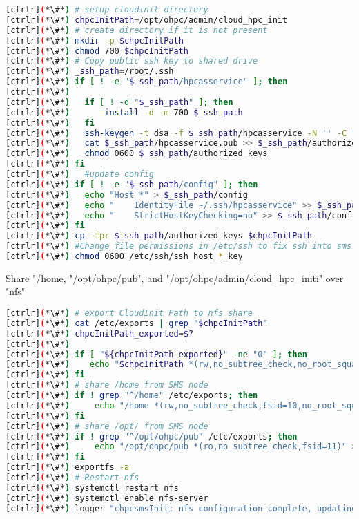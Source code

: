 \begin{lstlisting}[language=bash,keywords={}]
[ctrlr](*\#*) # setup cloudinit directory
[ctrlr](*\#*) chpcInitPath=/opt/ohpc/admin/cloud_hpc_init
[ctrlr](*\#*) # create directory if it is not present
[ctrlr](*\#*) mkdir -p $chpcInitPath
[ctrlr](*\#*) chmod 700 $chpcInitPath
[ctrlr](*\#*) # Copy public ssh key to shared drive
[ctrlr](*\#*) _ssh_path=/root/.ssh
[ctrlr](*\#*) if [ ! -e "$_ssh_path/hpcasservice" ]; then
[ctrlr](*\#*) 
[ctrlr](*\#*) 	if [ ! -d "$_ssh_path" ]; then
[ctrlr](*\#*) 		install -d -m 700 $_ssh_path
[ctrlr](*\#*) 	fi
[ctrlr](*\#*) 	ssh-keygen -t dsa -f $_ssh_path/hpcasservice -N '' -C "HPC Cluster key" > /dev/null 2>&1
[ctrlr](*\#*) 	cat $_ssh_path/hpcasservice.pub >> $_ssh_path/authorized_keys
[ctrlr](*\#*) 	chmod 0600 $_ssh_path/authorized_keys
[ctrlr](*\#*) fi
[ctrlr](*\#*) 	#update config
[ctrlr](*\#*) if [ ! -e "$_ssh_path/config" ]; then
[ctrlr](*\#*) 	echo "Host *" > $_ssh_path/config
[ctrlr](*\#*) 	echo "    IdentityFile ~/.ssh/hpcasservice" >> $_ssh_path/config
[ctrlr](*\#*) 	echo "    StrictHostKeyChecking=no" >> $_ssh_path/config
[ctrlr](*\#*) fi
[ctrlr](*\#*) cp -fpr $_ssh_path/authorized_keys $chpcInitPath
[ctrlr](*\#*) #Change file permissions in /etc/ssh to fix ssh into sms nodes
[ctrlr](*\#*) chmod 0600 /etc/ssh/ssh_host_*_key

\end{lstlisting} 

	Share "/home, "/opt/ohpc/pub", and "/opt/ohpc/admin/cloud\_hpc\_initi" over "nfs"


\begin{lstlisting}[language=bash,keywords={}]
[ctrlr](*\#*) # export CloudInit Path to nfs share
[ctrlr](*\#*) cat /etc/exports | grep "$chpcInitPath"
[ctrlr](*\#*) chpcInitPath_exported=$?
[ctrlr](*\#*) 
[ctrlr](*\#*) if [ "${chpcInitPath_exported}" -ne "0" ]; then
[ctrlr](*\#*)    echo "$chpcInitPath *(rw,no_subtree_check,no_root_squash)" >> /etc/exports
[ctrlr](*\#*) fi
[ctrlr](*\#*) # share /home from SMS node
[ctrlr](*\#*) if ! grep "^/home" /etc/exports; then
[ctrlr](*\#*)     echo "/home *(rw,no_subtree_check,fsid=10,no_root_squash)" >> /etc/exports
[ctrlr](*\#*) fi
[ctrlr](*\#*) # share /opt/ from SMS node
[ctrlr](*\#*) if ! grep "^/opt/ohpc/pub" /etc/exports; then
[ctrlr](*\#*)     echo "/opt/ohpc/pub *(ro,no_subtree_check,fsid=11)" >> /etc/exports
[ctrlr](*\#*) fi
[ctrlr](*\#*) exportfs -a
[ctrlr](*\#*) # Restart nfs
[ctrlr](*\#*) systemctl restart nfs
[ctrlr](*\#*) systemctl enable nfs-server
[ctrlr](*\#*) logger "chpcsmsInit: nfs configuration complete, updating remaining HPC configuration" 
\end{lstlisting} 

